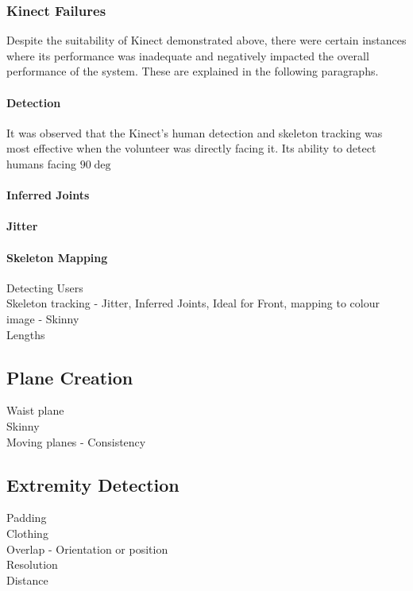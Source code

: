 \subsubsection{Kinect Failures}
Despite the suitability of Kinect demonstrated above, there were certain instances where its performance was inadequate and negatively impacted the overall performance of the system. These are explained in the following paragraphs. 

\paragraph{Detection}
It was observed that the Kinect's human detection and skeleton tracking was most effective when the volunteer was directly facing it. Its ability to detect humans facing $90\deg$

\paragraph{Inferred Joints}

\paragraph{Jitter}

\paragraph{Skeleton Mapping}
Detecting Users\\
Skeleton tracking - Jitter, Inferred Joints, Ideal for Front, mapping to colour image - Skinny\\
Lengths\\


\subsection{Plane Creation}
Waist plane\\
Skinny\\
Moving planes - Consistency\\

\subsection{Extremity Detection}
Padding\\
Clothing\\
Overlap - Orientation or position\\
Resolution\\
Distance\\


